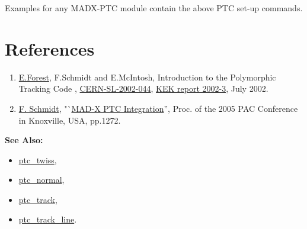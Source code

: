  Examples for any MADX-PTC module contain the above PTC set-up commands. 


\section{References}

\begin{enumerate}
   \item \href{E.Forest}{E.Forest}, F.Schmidt and E.McIntosh,
     Introduction to the Polymorphic Tracking Code ,
     \href{http://cern.ch/madx/doc/sl-2002-044.pdf}{CERN-SL-2002-044},
     \href{http://ccdb4fs.kek.jp/cgi-bin/img/allpdf?200302020}{KEK
       report 2002-3}, July 2002. 
   \item \href{F.Schmidt}{F. Schmidt},
     "`\href{http://cern.ch/madx/doc/MPPE012.pdf}{MAD-X PTC
     Integration}'', Proc. of the 2005 PAC Conference in
     Knoxville, USA, pp.1272. 
\end{enumerate}


{\bf See Also:}
\begin{itemize} 
   \item \href{../ptc_twiss/ptc_twiss.html}{ptc\_twiss},
   \item \href{../ptc_normal/ptc_normal.html}{ptc\_normal},
   \item \href{../ptc_track/ptc_track.html}{ ptc\_track},
   \item \href{../ptc_track_line/ptc_track_line.html}{ptc\_track\_line}. 
\end{itemize}


